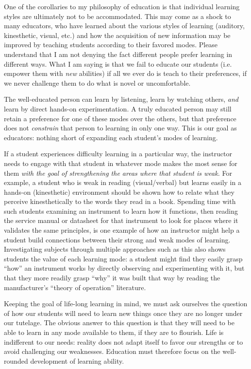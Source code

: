 \vskip 10pt

One of the corollaries to my philosophy of education is that individual learning styles are ultimately not to be accommodated.  This may come as a shock to many educators, who have learned about the various styles of learning (auditory, kinesthetic, visual, etc.) and how the acquisition of new information may be improved by teaching students according to their favored modes.  Please understand that I am not denying the fact different people prefer learning in different ways.  What I am saying is that we fail to educate our students (i.e. empower them with \textit{new} abilities) if all we ever do is teach to their preferences, if we never challenge them to do what is novel or uncomfortable.

The well-educated person can learn by listening, learn by watching others, \textit{and} learn by direct hands-on experimentation.  A truly educated person may still retain a preference for one of these modes over the others, but that preference does not \textit{constrain} that person to learning in only one way.  This is our goal as educators: nothing short of expanding each student's modes of learning.

If a student experiences difficulty learning in a particular way, the instructor needs to engage with that student in whatever mode makes the most sense for them \textit{with the goal of strengthening the areas where that student is weak.}  For example, a student who is weak in reading (visual/verbal) but learns easily in a hands-on (kinesthetic) environment should be shown how to relate what they perceive kinesthetically to the words they read in a book.  Spending time with such students examining an instrument to learn how it functions, then reading the service manual or datasheet for that instrument to look for places where it validates the same principles, is one example of how an instructor might help a student build connections between their strong and weak modes of learning.  Investigating subjects through multiple approaches such as this also shows students the value of each learning mode: a student might find they easily grasp ``how'' an instrument works by directly observing and experimenting with it, but that they more readily grasp ``why'' it was built that way by reading the manufacturer's ``theory of operation'' literature.

\vskip 10pt

Keeping the goal of life-long learning in mind, we must ask ourselves the question of how our students will need to learn new things once they are no longer under our tutelage.  The obvious answer to this question is that they will need to be able to learn in any mode available to them, if they are to flourish.  Life is indifferent to our needs: reality does not adapt itself to favor our strengths or to avoid challenging our weaknesses.  Education must therefore focus on the well-rounded development of learning ability.

